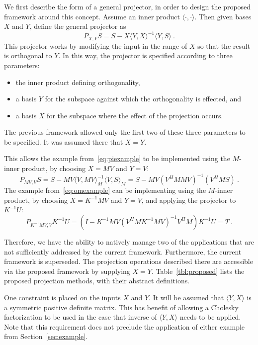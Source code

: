 \documentclass[12pt,letterpaper]{SANDreport}
\theoremstyle{example}
\newcommand{\inner}[2]{\langle #1,#2 \rangle}
\begin{document}
We first describe the form of a general projector, in order to design
the proposed framework around this concept. Assume an inner product
$\inner{\cdot}{\cdot}$. Then given bases $X$ and $Y$, define the
general projector as
\[
P_{X,Y} S = S - X \inner{Y}{X}^{-1} \inner{Y}{S}\ .
\]
This projector works by modifying the input in the range of $X$ so that the result is
orthogonal to $Y$. In this way, the projector is specified according to three parameters:
\begin{itemize}
  \item the inner product defining orthogonality, 
  \item a basis $Y$ for the subspace against which the orthogonality is effected, and
  \item a basis $X$ for the subspace where the effect of the projection occurs. 
\end{itemize}
The previous framework allowed only the first two of these three parameters to be
specified. It was assumed there that $X=Y$.

This allows the example from~\eqref{eq:piexample} to be implemented using the
$M$-inner product, by choosing $X=MV$ and $Y=V$:
\[
P_{MV,V} S = S - MV \inner{V}{MV}^{-1}_M \inner{V}{S}_M 
= S - MV (V^H M M V)^{-1} (V^H M S)\ . 
\]
The example from~\eqref{eq:omexample} can be implementing using the $M$-inner product, by
choosing $X=K^{-1} M V$ and $Y=V$, and applying the projector to $K^{-1} U$:
\[
P_{K^{-1} M V, V} K^{-1} U = \left( I - K^{-1} M V \left( V^H M K^{-1} M V \right)^{-1}
V^H M \right) K^{-1} U = T\ .
\]

Therefore, we have the ability to natively manage two of the applications that are not
sufficiently addressed by the current framework.  Furthermore, the current framework is
superseded. The projection operations described there are accessible via the proposed
framework by supplying $X=Y$.  Table~\ref{tbl:proposed} lists the proposed projection
methods, with their abstract definitions. 

One constraint is placed on the inputs $X$ and $Y$. It will be assumed that $\inner{Y}{X}$
is a symmetric positive definite matrix. This has benefit of allowing a Cholesky
factorization to be used in the case that inverse of $\inner{Y}{X}$ needs to be applied.
Note that this requirement does not preclude the application of either example from
Section~\ref{sec:example}.
\end{document}
